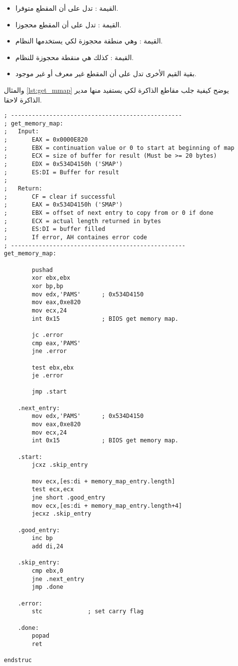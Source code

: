 \documentclass[document.tex]{subfiles}
\begin{document}
\begin{itemize}
\item القيمة : تدل على أن المقطع متوفرا.
\item القيمة : تدل على أن المقطع محجوزا.
\item القيمة :  وهي منطقة محجوزة لكي يستخدمها النظام.
\item القيمة : كذلك هي منقطة محجوزة للنظام.
\item بقية القيم الأخرى تدل على أن المقطع غير معرف أو غير موجود.

\end{itemize}

والمثال \ref{lst:get_mmap} يوضح كيفية جلب مقاطع الذاكرة لكي يستفيد منها مدير الذاكرة لاحقا.
\begin{english}
\lstset{numberstyle=\tiny,numbers=left,stepnumber=1,numbersep=5pt,tabsize=2,extendedchars=true,breaklines=true,frame=b,showspaces=false, showtabs=false,xleftmargin=10pt,framexleftmargin=10pt,framexrightmargin=5pt,framexbottommargin=4pt,showstringspaces=false,language=[x86masm]Assembler}

\begin{lstlisting}[label=lst:get_mmap,caption=\en{Get Memory Map}]
; -------------------------------------------------
; get_memory_map:
;	Input:
;		EAX = 0x0000E820
;		EBX = continuation value or 0 to start at beginning of map
;		ECX = size of buffer for result (Must be >= 20 bytes)
;		EDX = 0x534D4150h ('SMAP')
;		ES:DI = Buffer for result
;
;	Return:
;		CF = clear if successful
;		EAX = 0x534D4150h ('SMAP')
;		EBX = offset of next entry to copy from or 0 if done
;		ECX = actual length returned in bytes
;		ES:DI = buffer filled
;		If error, AH containes error code 
; --------------------------------------------------
get_memory_map:
		
		pushad
		xor ebx,ebx
		xor bp,bp
		mov edx,'PAMS'		; 0x534D4150
		mov eax,0xe820
		mov ecx,24
		int 0x15			; BIOS get memory map.
		
		jc .error
		cmp eax,'PAMS'
		jne .error
		
		test ebx,ebx
		je .error
		
		jmp .start
		
	.next_entry:
		mov edx,'PAMS'		; 0x534D4150
		mov eax,0xe820
		mov ecx,24
		int 0x15			; BIOS get memory map.
		
	.start:
		jcxz .skip_entry
		
		mov ecx,[es:di + memory_map_entry.length]
		test ecx,ecx
		jne short .good_entry
		mov ecx,[es:di + memory_map_entry.length+4]
		jecxz .skip_entry
	
	.good_entry:
		inc bp
		add di,24
	
	.skip_entry:
		cmp ebx,0
		jne .next_entry
		jmp .done
		
	.error:
		stc				; set carry flag
		
	.done:
		popad
		ret
		
endstruc
\end{lstlisting}
\end{english}
\end{document}
